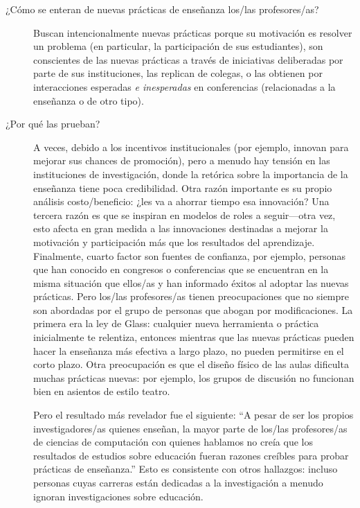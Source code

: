 \begin{description}


\item[¿Cómo se enteran de nuevas prácticas de enseñanza los/las profesores/as?]

Buscan intencionalmente nuevas prácticas
porque su motivación es  resolver un problema (en particular, la participación de sus estudiantes),
son conscientes de las nuevas prácticas a través de iniciativas deliberadas por parte de sus instituciones,
las replican de colegas,
o las obtienen por interacciones esperadas  \emph{e inesperadas} en conferencias
(relacionadas a la enseñanza o de otro tipo).

\item[¿Por qué las prueban?]

A veces, debido a los incentivos institucionales
(por ejemplo, innovan para mejorar sus chances de promoción),
pero a menudo hay tensión en las instituciones de investigación,
donde la retórica sobre la importancia de la enseñanza tiene poca credibilidad.
Otra razón importante es su propio análisis costo/beneficio:
¿les va a ahorrar tiempo esa innovación?
Una tercera razón es que se inspiran en modelos de roles a seguir---otra vez,
esto afecta en gran medida a las innovaciones destinadas a  mejorar la motivación y participación más que los resultados del aprendizaje.
Finalmente, cuarto factor son fuentes de confianza,
por ejemplo, personas que han  conocido en congresos o conferencias que se encuentran en la misma situación que ellos/as 
y han informado éxitos al adoptar las nuevas prácticas.
Pero los/las profesores/as tienen preocupaciones que no siempre son abordadas por el grupo de personas que abogan por modificaciones.
La primera era la ley de Glass:
cualquier nueva herramienta o práctica inicialmente te relentiza,
entonces mientras que las nuevas prácticas pueden hacer la enseñanza más efectiva a largo plazo, no pueden permitirse en el corto plazo.
Otra preocupación es que el diseño físico de las aulas dificulta muchas prácticas nuevas:
por ejemplo,
los grupos de discusión no funcionan bien en asientos de estilo teatro.

Pero el resultado más revelador fue el siguiente:
``A pesar de ser los propios investigadores/as quienes enseñan,
la mayor parte de los/las profesores/as de ciencias de computación con quienes hablamos
no creía que los resultados de estudios sobre educación fueran razones creíbles para probar prácticas de enseñanza.''
Esto es consistente con otros hallazgos:
incluso personas cuyas carreras están dedicadas  a la investigación a menudo ignoran investigaciones sobre educación. 


\end{description}
